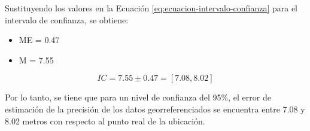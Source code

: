 Sustituyendo los valores en la Ecuación \ref{eq:ecuacion-intervalo-confianza} para el intervalo de confianza, se obtiene:

\begin{itemize}
    \item ME = 0.47
    \item M = 7.55
\end{itemize}

\begin{equation}
    IC = 7.55 \pm 0.47 = [7.08, 8.02]
    \label{eq:ecuacion-resultado-intervalo-confianza}
\end{equation}

Por lo tanto, se tiene que para un nivel de confianza del 95\%, el error de estimación de la precisión de los datos georreferenciados
se encuentra entre 7.08 y 8.02 metros con respecto al punto real de la ubicación.